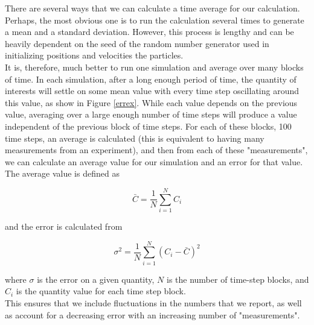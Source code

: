 \documentclass{article}
\begin{document}
\begin{multicols}{2}
There are several ways that we can calculate a time average for our calculation.  Perhaps, the most obvious one is to run the calculation several times to generate a mean and a standard deviation.  However, this process is lengthy and can be heavily dependent on the seed of the random number generator used in initializing positions and velocities the particles.  \\



It is, therefore, much better to run one simulation and average over many blocks of time.  In each simulation, after a long enough period of time, the quantity of interests will settle on some mean value with every time step oscillating around this value, as show in Figure \ref{errex}.  While each value depends on the previous value, averaging over a large enough number of time steps will produce a value independent of the previous block of time steps.  For each of these blocks, 100 time steps, an average is calculated (this is equivalent to having many measurements from an experiment), and then from each of these "measurements", we can calculate an average value for our simulation and an error for that value.  The average value is defined as 

\begin{equation}
\bar{C} = \frac{1}{N}\sum \limits _{i=1}^N C_i 
\end{equation}

\noindent and the error is calculated from 

\begin{equation}
\sigma ^2 = \frac{1}{N}\sum \limits _{i=1}^N (C_i - \bar{C})^2
\end{equation}

\noindent where $\sigma$ is the error on a given quantity, $N$ is the number of time-step blocks, and $C_i$ is the quantity value for each time step block.\\

This ensures that we include fluctuations in the numbers that we report, as well as account for a decreasing error with an increasing number of "measurements".  

\end{multicols}




  
\end{document}
